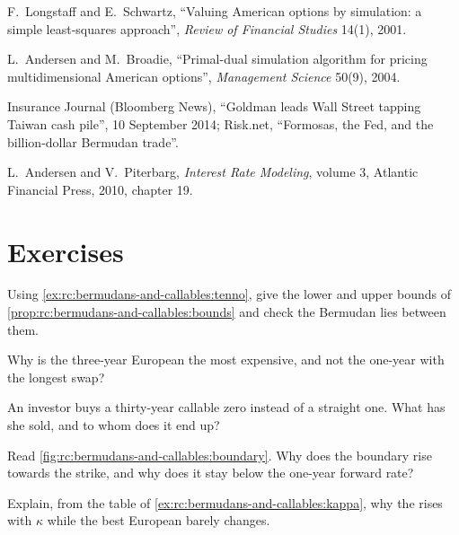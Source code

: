\begin{omsources}
\item F.\ Longstaff and E.\ Schwartz, ``Valuing American options by simulation: a
simple least-squares approach'', \emph{Review of Financial Studies} 14(1), 2001.
\item L.\ Andersen and M.\ Broadie, ``Primal-dual simulation algorithm for pricing
multidimensional American options'', \emph{Management Science} 50(9), 2004.
\item Insurance Journal (Bloomberg News), ``Goldman leads Wall Street tapping
Taiwan cash pile'', 10 September 2014; Risk.net, ``Formosas, the Fed, and the
billion-dollar Bermudan trade''.
\item L.\ Andersen and V.\ Piterbarg, \emph{Interest Rate Modeling}, volume 3,
Atlantic Financial Press, 2010, chapter 19.
\end{omsources}

\section{Exercises}

\begin{exercise}[$\star$]\label{exo:rc:bermudans-and-callables:1}
Using \cref{ex:rc:bermudans-and-callables:tenno}, give the lower and upper bounds
of \cref{prop:rc:bermudans-and-callables:bounds} and check the Bermudan lies
between them.
\end{exercise}

\begin{exercise}[$\star$]\label{exo:rc:bermudans-and-callables:2}
Why is the three-year European the most expensive, and not the one-year with the
longest swap?
\end{exercise}

\begin{exercise}[$\star$]\label{exo:rc:bermudans-and-callables:3}
An investor buys a thirty-year callable zero instead of a straight one. What has
she sold, and to whom does it end up?
\end{exercise}

\begin{exercise}[$\star\star$]\label{exo:rc:bermudans-and-callables:4}
Read \cref{fig:rc:bermudans-and-callables:boundary}. Why does the boundary rise
towards the strike, and why does it stay below the one-year forward rate?
\end{exercise}

\begin{exercise}[$\star\star$]\label{exo:rc:bermudans-and-callables:5}
Explain, from the table of \cref{ex:rc:bermudans-and-callables:kappa}, why the  rises with $\kappa$ while the best European barely changes.
\end{exercise}

